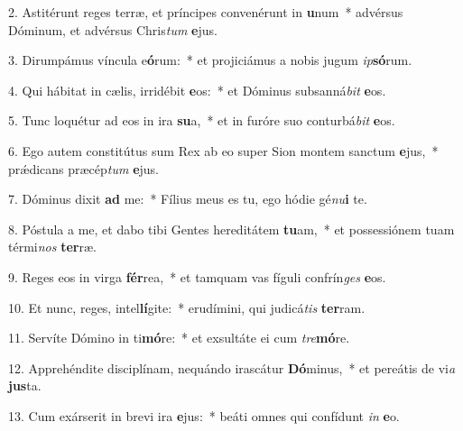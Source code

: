 2. Astitérunt reges terræ, et príncipes convenérunt in \textbf{u}num~*  advérsus Dóminum, et advérsus Chris\textit{tum} \textbf{e}jus.\

3. Dirumpámus víncula e\textbf{ó}rum:~*  et projiciámus a nobis jugum \textit{ip}\textbf{só}rum.\

4. Qui hábitat in cælis, irridébit \textbf{e}os:~*  et Dóminus subsanná\textit{bit} \textbf{e}os.\

5. Tunc loquétur ad eos in ira \textbf{su}a,~*  et in furóre suo conturbá\textit{bit} \textbf{e}os.\

6. Ego autem constitútus sum Rex ab eo super Sion montem sanctum \textbf{e}jus,~*  prǽdicans præcép\textit{tum} \textbf{e}jus.\

7. Dóminus dixit \textbf{ad} me:~*  Fílius meus es tu, ego hódie gé\textit{nu}\textbf{i} te.\

8. Póstula a me, et dabo tibi Gentes hereditátem \textbf{tu}am,~*  et possessiónem tuam térmi\textit{nos} \textbf{ter}ræ.\

9. Reges eos in virga \textbf{fér}rea,~*  et tamquam vas fíguli confrín\textit{ges} \textbf{e}os.\

10. Et nunc, reges, intel\textbf{lí}gite:~*  erudímini, qui judicá\textit{tis} \textbf{ter}ram.\

11. Servíte Dómino in ti\textbf{mó}re:~*  et exsultáte ei cum \textit{tre}\textbf{mó}re.\

12. Apprehéndite disciplínam, nequándo irascátur \textbf{Dó}minus,~*  et pereátis de vi\textit{a} \textbf{jus}ta.\

13. Cum exárserit in brevi ira \textbf{e}jus:~*  beáti omnes qui confídunt \textit{in} \textbf{e}o.\

